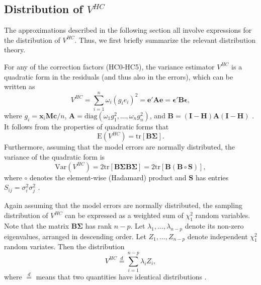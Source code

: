 \documentclass[12pt]{article}\usepackage[]{graphicx}\usepackage[]{color}
\newcommand{\E}{\text{E}}
\newcommand{\Var}{\text{Var}}
\newcommand{\tr}{\text{tr}}
\newcommand{\diag}{\text{diag}}
\newcommand{\bm}{\mathbf}
\newcommand{\bs}{\boldsymbol}
\begin{document}
\subsection{Distribution of $V^{HC}$}
\label{subsec:distribution_theory}

The approximations described in the following section all involve expressions for the distribution of $V^{HC}$. Thus, we first briefly summarize the relevant distribution theory. 

For any of the correction factors (HC0-HC5), the variance estimator $V^{HC}$ is a quadratic form in the residuals (and thus also in the errors), which can be written as 
\[
V^{HC} = \sum_{i=1}^n \omega_i \left(g_i e_i\right)^2 = \bm{e}' \bm{A} \bm{e} = \bs\epsilon' \bm{B} \bs\epsilon , \]
where $g_i = \bm{x}_i \bm{M} \bm{c} / n$, $\bm{A} = \diag\left(\omega_1 g_1^2,...,\omega_n g_n^2\right)$, and $\bm{B} = \left(\bm{I} - \bm{H}\right)\bm{A}\left(\bm{I} - \bm{H}\right)$ \citep{Bell2002bias, Cribari-Neto2011new}. 
It follows from the properties of quadratic forms that 
\begin{equation}
\label{eq:V_expectation}
\E\left(V^{HC}\right) = \tr\left[\bm{B}\bs\Sigma\right]. 
\end{equation}
Furthermore, assuming that the model errors are normally distributed, the variance of the quadratic form is
\begin{equation}
\label{eq:V_variance}
\Var\left(V^{HC}\right) = 2\tr\left[\bm{B} \bs\Sigma \bm{B} \bs\Sigma\right] = 2\tr\left[\bm{B} \left(\bm{B} \circ \bm{S}\right)\right], 
\end{equation}
where $\circ$ denotes the element-wise (Hadamard) product and $\bm{S}$ has entries $S_{ij} = \sigma_i^2 \sigma_j^2$ \citep{Lipsitz1999degrees}. 

Again assuming that the model errors are normally distributed, the sampling distribution of $V^{HC}$ can be expressed as a weighted sum of $\chi^2_1$ random variables. 
Note that the matrix $\bm{B}\bs\Sigma$ has rank $n - p$. 
Let $\lambda_1,...,\lambda_{n - p}$ denote its non-zero eigenvalues, arranged in descending order. 
Let $Z_1,...,Z_{n-p}$ denote independent $\chi^2_1$ random variates. 
Then the distribution 
\begin{equation}
\label{eq:weighted_sum_chi_sq}
V^{HC} \stackrel{d}{=} \sum_{i=1}^{n-p} \lambda_i Z_i,
\end{equation}
where $\stackrel{d}{=}$ means that two quantities have identical distributions \citep[][Eq. 4.1.1]{mathai1992quadratic}.
\end{document}
